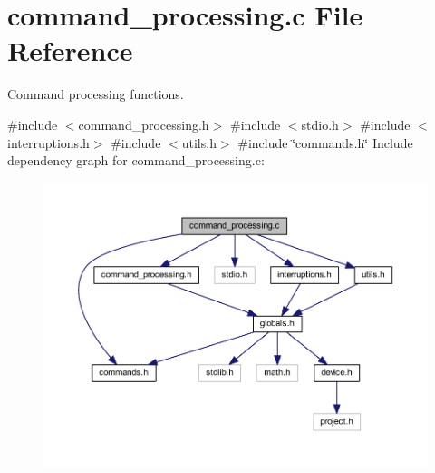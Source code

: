 \section{command\+\_\+processing.\+c File Reference}
\label{command__processing_8c}


Command processing functions.  


{\ttfamily \#include $<$command\+\_\+processing.\+h$>$}\newline
{\ttfamily \#include $<$stdio.\+h$>$}\newline
{\ttfamily \#include $<$interruptions.\+h$>$}\newline
{\ttfamily \#include $<$utils.\+h$>$}\newline
{\ttfamily \#include \char`\"{}commands.\+h\char`\"{}}\newline
Include dependency graph for command\+\_\+processing.\+c\+:
\nopagebreak
\begin{figure}[H]
\begin{center}
\leavevmode
\includegraphics[width=350pt]{command__processing_8c__incl}
\end{center}
\end{figure}
